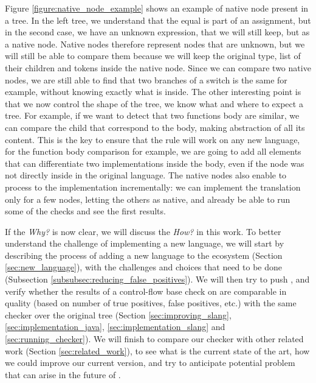 Figure \ref{figure:native_node_example} shows an example of native node present in a \slang{} tree. In the left tree, we understand that the equal is part of an assignment, but in the second case, we have an unknown expression, that we will still keep, but as a native node.
Native nodes therefore represent nodes that are unknown, but we will still be able to compare them because we will keep the original type, list of their children and tokens inside the native node. 
Since we can compare two native nodes, we are still able to find that two branches of a switch is the same for example, without knowing exactly what is inside. 
The other interesting point is that we now control the shape of the tree, we know what and where to expect a tree. 
For example, if we want to detect that two functions body are similar, we can compare the child that correspond to the body, making abstraction of all its content.
This is the key to ensure that the rule will work on any new language, for the function body comparison for example, we are going to add all elements that can differentiate two implementations inside the body, even if the node was not directly inside in the original language.
The native nodes also enable to process to the implementation incrementally: we can implement the translation only for a few nodes, letting the others as native, and already be able to run some of the checks and see the first results.


If the \emph{Why?} is now clear, we will discuss the \emph{How?} in this work. 
To better understand the challenge of implementing a new language, we will start by describing the process of adding a new language to the ecosystem (Section \ref{sec:new_language}), with the challenges and choices that need to be done (Subsection \ref{subsubsec:reducing_false_positives}). 
We will then try to push \slang{}, and verify whether the results of a control-flow base check on \slang{} are comparable in quality (based on number of true positives, false positives, etc.) with the same checker over the original tree (Section \ref{sec:improving_slang}, \ref{sec:implementation_java}, \ref{sec:implementation_slang} and \ref{sec:running_checker}).
We will finish to compare our checker with other related work (Section \ref{sec:related_work}), to see what is the current state of the art, how we could improve our current version, and try to anticipate potential problem that can arise in the future of \slang{}.




